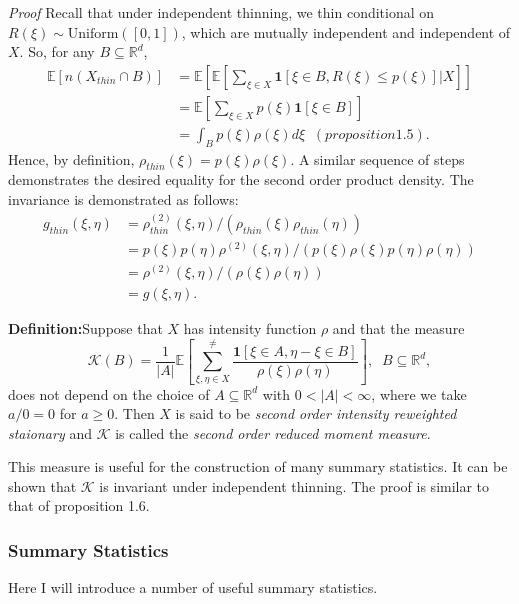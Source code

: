 \documentclass[12pt,twoside]{reedthesis}
\begin{document}
  \emph{Proof} Recall that under independent thinning, we thin conditional
  on \(R(\xi) \sim \text{Uniform}([0, 1])\), which are mutually
  independent and independent of \(X\). So, for any
  \(B\subseteq \mathbb{R}^d\), \[
  \begin{aligned}
  \mathbb{E}[n(X_{thin}\cap B)] &= \mathbb{E}[\mathbb{E}[\sum_{\xi \in X} \mathbf{1}[\xi \in B, R(\xi)\leq p(\xi)]| X]]\\
  & = \mathbb{E}[ \sum_{\xi \in X} p(\xi) \mathbf{1} [\xi \in B]] \\
  &= \int_B p(\xi) \rho(\xi) d\xi \; \; (proposition 1.5).
  \end{aligned}
  \] Hence, by definition, \(\rho_{thin}(\xi) = p(\xi)\rho(\xi)\). A
  similar sequence of steps demonstrates the desired equality for the
  second order product density. The invariance is demonstrated as follows:
  \[
  \begin{aligned}
  g_{thin}(\xi, \eta) &= \rho_{thin}^{(2)}(\xi, \eta)/ (\rho_{thin}(\xi)\rho_{thin}(\eta))\\
  &= p(\xi)p(\eta)\rho^{(2)}(\xi, \eta)/(p(\xi)\rho(\xi)p(\eta)\rho(\eta)) \\
  &= \rho^{(2)}(\xi, \eta)/(\rho(\xi)\rho(\eta)) \\
  &= g(\xi, \eta).
  \end{aligned}
  \]
  
  \textbf{Definition:}Suppose that \(X\) has intensity function \(\rho\)
  and that the measure
  \[\mathcal{K}(B) = \frac{1}{|A|}\mathbb{E}[ \sum_{\xi, \eta \in X}^{\neq}  \frac{\mathbf{1}[\xi \in A, \eta - \xi \in B]}{\rho(\xi) \rho(\eta)}], \; \; B \subseteq \mathbb{R}^d, \]
  does not depend on the choice of \(A\subseteq \mathbb{R}^d\) with
  \(0 < |A| < \infty\), where we take \(a/0 = 0\) for \(a \geq 0\). Then
  \(X\) is said to be \emph{second order intensity reweighted staionary}
  and \(\mathcal{K}\) is called the \emph{second order reduced moment
  measure}.
  
  This measure is useful for the construction of many summary statistics.
  It can be shown that \(\mathcal{K}\) is invariant under independent
  thinning. The proof is similar to that of proposition 1.6.
  
  \subsubsection{Summary Statistics}\label{summary-statistics}
  
  Here I will introduce a number of useful summary statistics.
  
\end{document}
